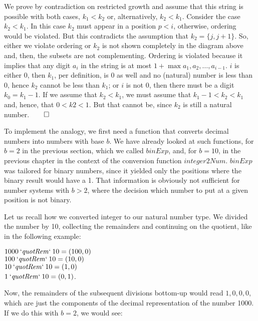 \documentclass{scrreprt}
\newcommand{\Varid}[1]{\mathit{#1}}
\begin{document}
We prove by contradiction on restricted growth and assume
that this string is possible with both cases,
$k_1 < k_2$ or, alternatively, $k_2 < k_1$.
Consider the case $k_2 < k_1$.
In this case $k_2$ must appear in a position $p < i$,
otherwise, ordering would be violated. 
But this contradicts the assumption that $k_2 = \lbrace j,j+1\rbrace$.
So, either we violate ordering or $k_2$ is not shown completely
in the diagram above and, then, the subsets are not complementing. 
Ordering is violated because it implies that any digit $a_i$ in the string
is at most $1 + \max{a_1, a_2, \dots, a_{i-1}}$.
$i$ is either 0, then $k_1$, per definition, is 0 as well
and no (natural) number is less than 0, 
hence $k_2$ cannot be less than $k_1$;
or $i$ is not 0, then there must be a digit $k_0 = k_1 - 1$.
If we assume that $k_2 < k_1$, we must assume that 
$k_1 - 1 < k_2 < k_1$ and, hence, that $0 < k2 < 1$.
But that cannot be, 
since $k_2$ is still a natural number.$\qed$

To implement the  analogy,
we first need a function that converts decimal numbers
into numbers with base $b$.
We have already looked at such functions,
for $b = 2$ in the previous section,
which we called \ensuremath{\Varid{binExp}}, and, for $b=10$,
in the previous chapter in the context of
the conversion function \ensuremath{\Varid{integer2Num}}.
\ensuremath{\Varid{binExp}} was tailored for binary numbers,
since it yielded only the positions 
where the binary result would have a 1.
That information is obviously not sufficient
for number systems with $b > 2$, where the decision
which number to put at a given position is not binary.

Let us recall how we converted integer to 
our natural number type.
We divided the number by 10,
collecting the remainders and continuing on the quotient,
like in the following example:

\ensuremath{\mathrm{1000}\mathbin{`\Varid{quotRem}`}\mathrm{10}\mathrel{=}(\mathrm{100},\mathrm{0})}\\
\ensuremath{\mathrm{100}\mathbin{`\Varid{quotRem}`}\mathrm{10}\mathrel{=}(\mathrm{10},\mathrm{0})}\\
\ensuremath{\mathrm{10}\mathbin{`\Varid{quotRem}`}\mathrm{10}\mathrel{=}(\mathrm{1},\mathrm{0})}\\
\ensuremath{\mathrm{1}\mathbin{`\Varid{quotRem}`}\mathrm{10}\mathrel{=}(\mathrm{0},\mathrm{1})}.

Now, the remainders of the subsequent divisions
bottom-up would read $1,0,0,0$, which are just 
the components of the decimal representation 
of the number \num{1000}.
If we do this with $b=2$, we would see:
\end{document}
